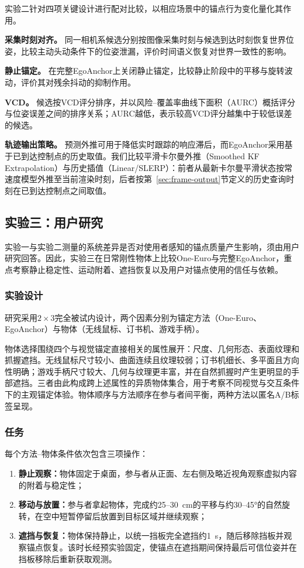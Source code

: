 \documentclass[review]{vgtc}
\begin{document}
实验二针对四项关键设计进行配对比较，以相应场景中的锚点行为变化量化其作用。

\textbf{采集时刻对齐。}
同一相机系候选分别按图像采集时刻与候选到达时刻恢复世界位姿，比较主动头动条件下的位姿泄漏，评价时间语义恢复对世界一致性的影响。

\textbf{静止锚定。}
在完整EgoAnchor上关闭静止锚定，比较静止阶段中的平移与旋转波动，评价其对残余抖动的抑制作用。

\textbf{VCD。}
候选按VCD评分排序，并以风险--覆盖率曲线下面积（AURC）概括评分与位姿误差之间的排序关系；AURC越低，表示较高VCD评分越集中于较低误差的候选。

\textbf{轨迹输出策略。}
预测外推可用于降低实时跟踪的响应滞后，而EgoAnchor采用基于已到达控制点的历史取值。我们比较平滑卡尔曼外推（Smoothed KF Extrapolation）与历史插值（Linear/SLERP）：前者从最新卡尔曼平滑状态按常速度模型外推至当前渲染时刻，后者按第~\ref{sec:frame-output}节定义的历史查询时刻在已到达控制点之间取值。

\subsection{实验三：用户研究}\label{sec:exp3-design}

实验一与实验二测量的系统差异是否对使用者感知的锚点质量产生影响，须由用户研究回答。因此，实验三在日常刚性物体上比较One-Euro与完整EgoAnchor，重点考察静止稳定性、运动附着、遮挡恢复以及用户对锚点使用的信任与依赖。

\subsubsection{实验设计}

研究采用$2 \times 3$完全被试内设计，两个因素分别为锚定方法（One-Euro、EgoAnchor）与物体（无线鼠标、订书机、游戏手柄）。

物体选择围绕四个与视觉锚定直接相关的属性展开：尺度、几何形态、表面纹理和抓握遮挡。无线鼠标尺寸较小、曲面连续且纹理较弱；订书机细长、多平面且方向性明确；游戏手柄尺寸较大、几何与纹理更丰富，并在自然抓握时产生更明显的手部遮挡。三者由此构成跨上述属性的异质物体集合，用于考察不同视觉与交互条件下的主观锚定体验。物体顺序与方法顺序在参与者间平衡，两种方法以匿名A/B标签呈现。

\subsubsection{任务}

每个方法--物体条件依次包含三项操作：
\begin{enumerate}[leftmargin=1.8em,label=(\arabic*),itemsep=1pt,topsep=2pt]
  \item \textbf{静止观察：}物体固定于桌面，参与者从正面、左右侧及略近视角观察虚拟内容的附着与稳定性；
  \item \textbf{移动与放置：}参与者拿起物体，完成约25--30~cm的平移与约30--45°的自然旋转，在空中短暂停留后放置到目标区域并继续观察；
  \item \textbf{遮挡与恢复：}物体保持静止，以统一挡板完全遮挡约1~s，随后移除挡板并观察锚点恢复。该时长经预实验固定，使锚点在遮挡期间保持最后可信位姿并在挡板移除后重新获取观测。
\end{enumerate}
\end{document}
